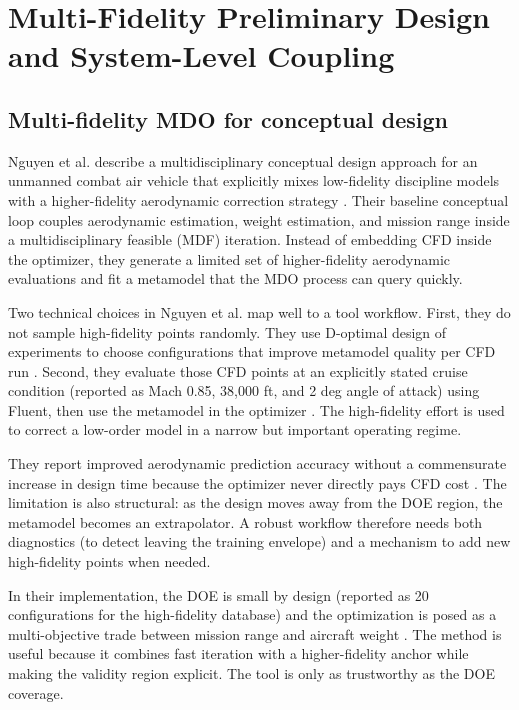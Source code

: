 \chapter{Multi-Fidelity Preliminary Design and System-Level Coupling}
\section{Multi-fidelity MDO for conceptual design}
Nguyen et al. describe a multidisciplinary conceptual design approach for an unmanned combat air vehicle that explicitly mixes low-fidelity discipline models with a higher-fidelity aerodynamic correction strategy \cite{Nguyen2013MFM}. Their baseline conceptual loop couples aerodynamic estimation, weight estimation, and mission range inside a multidisciplinary feasible (MDF) iteration. Instead of embedding CFD inside the optimizer, they generate a limited set of higher-fidelity aerodynamic evaluations and fit a metamodel that the MDO process can query quickly.

Two technical choices in Nguyen et al. map well to a tool workflow. First, they do not sample high-fidelity points randomly. They use D-optimal design of experiments to choose configurations that improve metamodel quality per CFD run \cite{Nguyen2013MFM}. Second, they evaluate those CFD points at an explicitly stated cruise condition (reported as Mach 0.85, 38,000 ft, and 2 deg angle of attack) using Fluent, then use the metamodel in the optimizer \cite{Nguyen2013MFM}. The high-fidelity effort is used to correct a low-order model in a narrow but important operating regime.

They report improved aerodynamic prediction accuracy without a commensurate increase in design time because the optimizer never directly pays CFD cost \cite{Nguyen2013MFM}. The limitation is also structural: as the design moves away from the DOE region, the metamodel becomes an extrapolator. A robust workflow therefore needs both diagnostics (to detect leaving the training envelope) and a mechanism to add new high-fidelity points when needed.

In their implementation, the DOE is small by design (reported as 20 configurations for the high-fidelity database) and the optimization is posed as a multi-objective trade between mission range and aircraft weight \cite{Nguyen2013MFM}. The method is useful because it combines fast iteration with a higher-fidelity anchor while making the validity region explicit. The tool is only as trustworthy as the DOE coverage.

